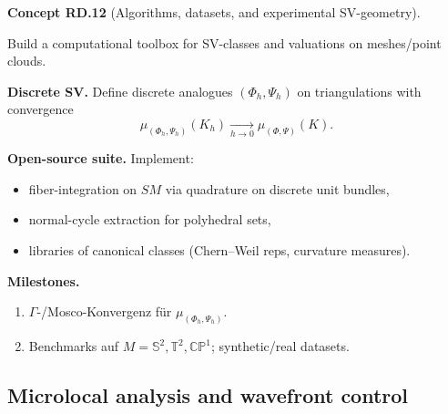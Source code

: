 \documentclass[10pt, letterpaper]{article}
\newcommand{\CustomHeading}[3]{%
  \par\medskip\noindent%
  \textbf{#1 #2} \textnormal{(#3)}.\enskip%
}
\newenvironment{CONC}[2]{\begin{unitbox}\CustomHeading{Concept}{#1}{#2}}{\end{unitbox}}
\begin{document}
\begin{CONC}{RD.12}{Algorithms, datasets, and experimental SV-geometry}
Build a computational toolbox for SV-classes and valuations on meshes/point clouds.

\medskip\noindent\textbf{Discrete SV.}
Define discrete analogues $(\Phi_h,\Psi_h)$ on triangulations with convergence
\[
\mu_{(\Phi_h,\Psi_h)}(K_h)\xrightarrow[h\to 0]{}\mu_{(\Phi,\Psi)}(K).
\]

\medskip\noindent\textbf{Open-source suite.}
Implement:
\begin{itemize}
\item fiber-integration on $SM$ via quadrature on discrete unit bundles,
\item normal-cycle extraction for polyhedral sets,
\item libraries of canonical classes (Chern–Weil reps, curvature measures).
\end{itemize}

\medskip\noindent\textbf{Milestones.}
\begin{enumerate}[label=(\roman*)]
\item $\Gamma$-/Mosco-Konvergenz für $\mu_{(\Phi_h,\Psi_h)}$.
\item Benchmarks auf $M=\mathbb S^2,\mathbb T^2,\mathbb{CP}^1$; synthetic/real datasets.
\end{enumerate}
\end{CONC}


\subsection{Microlocal analysis and wavefront control}
\end{document}
